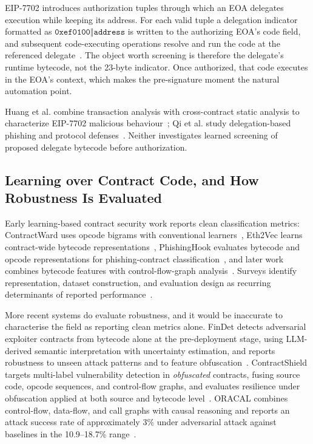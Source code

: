 \documentclass[conference]{IEEEtran}
\newcommand{\code}[1]{\texttt{#1}}
\begin{document}
EIP-7702 introduces authorization tuples through which an EOA delegates execution while keeping its address. For each valid tuple a delegation indicator formatted as $\code{0xef0100}\Vert\code{address}$ is written to the authorizing EOA's code field, and subsequent code-executing operations resolve and run the code at the referenced delegate~\cite{eip7702}. The object worth screening is therefore the delegate's runtime bytecode, not the 23-byte indicator. Once authorized, that code executes in the EOA's context, which makes the pre-signature moment the natural automation point.

Huang et al. combine transaction analysis with cross-contract static analysis to characterize EIP-7702 malicious behaviour~\cite{huang2026darkside}; Qi et al. study delegation-based phishing and protocol defenses~\cite{qi2025eip7702}. Neither investigates learned screening of proposed delegate bytecode before authorization.

\subsection{Learning over Contract Code, and How Robustness Is Evaluated}

Early learning-based contract security work reports clean classification metrics: ContractWard uses opcode bigrams with conventional learners~\cite{contractward2021}, Eth2Vec learns contract-wide bytecode representations~\cite{eth2vec2022}, PhishingHook evaluates bytecode and opcode representations for phishing-contract classification~\cite{phishinghook2025}, and later work combines bytecode features with control-flow-graph analysis~\cite{smartbugbert2025}. Surveys identify representation, dataset construction, and evaluation design as recurring determinants of reported performance~\cite{wang2026review}.

More recent systems do evaluate robustness, and it would be inaccurate to characterise the field as reporting clean metrics alone. FinDet detects adversarial exploiter contracts from bytecode alone at the pre-deployment stage, using LLM-derived semantic interpretation with uncertainty estimation, and reports robustness to unseen attack patterns and to feature obfuscation~\cite{findet2025}. ContractShield targets multi-label vulnerability detection in \emph{obfuscated} contracts, fusing source code, opcode sequences, and control-flow graphs, and evaluates resilience under obfuscation applied at both source and bytecode level~\cite{contractshield2026}. ORACAL combines control-flow, data-flow, and call graphs with causal reasoning and reports an attack success rate of approximately 3\% under adversarial attack against baselines in the 10.9--18.7\% range~\cite{oracal2026}.
\end{document}
